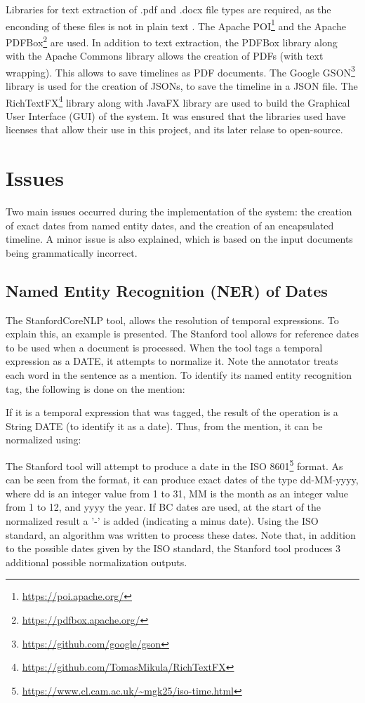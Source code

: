 \par Libraries for text extraction of .pdf and .docx file types are required, as the enconding of these files is not in plain text . The Apache POI\footnote{\url{https://poi.apache.org/}} and the Apache PDFBox\footnote{\url{https://pdfbox.apache.org/}} are used. In addition to text extraction, the PDFBox library along with the Apache Commons library allows the creation of PDFs (with text wrapping). This allows to save timelines as PDF documents. The Google GSON\footnote{\url{https://github.com/google/gson}} library is used for the creation of JSONs, to save the timeline in a JSON file. The RichTextFX\footnote{\url{https://github.com/TomasMikula/RichTextFX}} library along with JavaFX library are used to build the Graphical User Interface (GUI) of the system. It was ensured that the libraries used have licenses that allow their use in this project, and its later relase to open-source.

\section{Issues}
\par Two main issues occurred during the implementation of the system: the creation of exact dates from named  entity dates, and the creation of an encapsulated timeline. A minor issue is also explained, which is based on the input documents being grammatically incorrect.

\subsection{Named Entity Recognition (NER) of Dates}
\par The StanfordCoreNLP tool, allows the resolution of temporal expressions. To explain this, an example is presented. The Stanford tool allows for reference dates to be used when a document is processed. When the tool tags a temporal expression as a DATE, it attempts to normalize it. Note the annotator treats each word in the sentence as a mention. To identify its named entity recognition tag, the following is done on the mention: \par
{}
If it is a temporal expression that was tagged, the result of the operation is a String DATE (to identify it as a date). Thus, from the mention, it can be normalized using: \par
{}
The Stanford tool will attempt to produce a date in the ISO 8601\footnote{\url{https://www.cl.cam.ac.uk/~mgk25/iso-time.html}} format. As can be seen from the format, it can produce exact dates of the type dd-MM-yyyy, where dd is an integer value from 1 to 31, MM is the month as an integer value from 1 to 12, and yyyy the year. If BC dates are used, at the start of the normalized result a '-' is added (indicating a minus date). Using the ISO standard, an algorithm was written to process these dates. Note that, in addition to the possible dates given by the ISO standard, the Stanford tool produces 3 additional possible normalization outputs.

